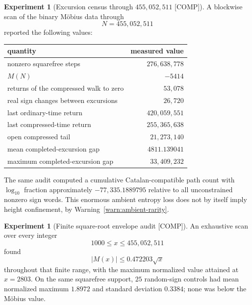 \documentclass[11pt]{amsart}
\numberwithin{equation}{section}
\theoremstyle{plain}
\theoremstyle{definition}
\newtheorem{experiment}[theorem]{Experiment}
\theoremstyle{remark}
\newcommand{\Mert}{M}
\newcommand{\COMP}{\textup{[COMP]}}
\begin{document}
\begin{experiment}[Excursion census through $455{,}052{,}511$ \COMP]
\label{exp:excursion-census}
A blockwise scan of the binary M\"obius data through
\begin{equation}
N=455{,}052{,}511
\label{eq:data-N}
\end{equation}
reported the following values:
\begin{center}
\begin{tabular}{lr}
\toprule
quantity & measured value\\
\midrule
nonzero squarefree steps & $276{,}638{,}778$\\
$\Mert(N)$ & $-5414$\\
returns of the compressed walk to zero & $53{,}078$\\
real sign changes between excursions & $26{,}720$\\
last ordinary-time return & $420{,}059{,}551$\\
last compressed-time return & $255{,}365{,}638$\\
open compressed tail & $21{,}273{,}140$\\
mean completed-excursion gap & $4811.139041$\\
maximum completed-excursion gap & $33{,}409{,}232$\\
\bottomrule
\end{tabular}
\end{center}
The same audit computed a cumulative Catalan-compatible path count with
$\log_{10}$ fraction approximately $-77{,}335.1889795$ relative to all unconstrained nonzero sign words.  This enormous ambient entropy
loss does not by itself imply height confinement, by Warning~\ref{warn:ambient-rarity}.
\end{experiment}

\begin{experiment}[Finite square-root envelope audit \COMP]
\label{exp:finite-sqrt-envelope}
An exhaustive scan over every integer
\begin{equation}
1000\le x\le455{,}052{,}511
\label{eq:finite-envelope-range}
\end{equation}
found
\begin{equation}
|\Mert(x)|\le0.472203\sqrt x
\label{eq:finite-envelope}
\end{equation}
throughout that finite range, with the maximum normalized value attained at $x=2803$.  On the same squarefree support, $25$ random-sign
controls had mean normalized maximum $1.8972$ and standard deviation $0.3384$; none was below the M\"obius value.
\end{experiment}
\end{document}
